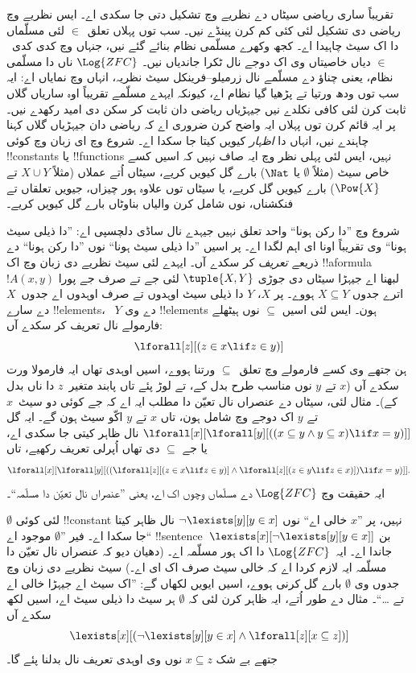 \documentclass[../../../include/open-logic-section]{subfiles}
\begin{document}


تقریباً ساری ریاضی سیٹاں دے نظریے وچ تشکیل دتی جا سکدی اے۔
ایس نظریے وچ ریاضی دی تشکیل لئی کئی کم کرن پینڈے نیں۔ سب توں
پہلاں تعلق~$\in$ لئی مسلّماں دا اک سیٹ چاہیدا اے۔ کجھ وکھرے
مسلّمی نظام بنائے گئے نیں، جنہاں وچ کدی کدی~$\in$ دیاں
خاصیتاں وی اک دوجے نال ٹکرا جاندیاں نیں۔ $\Log{ZFC}$ ناں دا
مسلّمی نظام، یعنی چناؤ دے مسلّمے نال زرمیلو--فرینکل سیٹ نظریہ،
انہاں وچ نمایاں اے: ایہ سب توں ودھ ورتیا تے پڑھیا گیا نظام اے،
کیونکہ ایہدے مسلّمے تقریباً اوہ ساریاں گلاں ثابت کرن لئی کافی
نکلدے نیں جیہڑیاں ریاضی دان ثابت کر سکن دی امید رکھدے نیں۔
پر ایہ قائم کرن توں پہلاں ایہ واضح کرن ضروری اے کہ ریاضی دان
جیہڑیاں گلاں کہنا چاہندے نیں، انہاں دا \emph{اظہار} کیویں
کیتا جا سکدا اے۔ شروع وچ ای زبان وچ کوئی !!{constant}s یا
!!{function}s نہیں، ایس لئی پہلی نظر وچ ایہ صاف نہیں کہ اسیں
کسے خاص سیٹ (مثلاً $\emptyset$ یا $\Nat$) بارے گل کیویں کریے،
سیٹاں اُتے عملاں (مثلاً $X \cup Y$ تے $\Pow{X}$) بارے کیویں
گل کریے، یا سیٹاں توں علاوہ ہور چیزاں، جیویں تعلقاں تے
فنکشناں، نوں شامل کرن والیاں بناوٹاں بارے گل کیویں کریے۔

شروع وچ ”دا رکن ہونا“ واحد تعلق نہیں جیہدے نال ساڈی دلچسپی اے:
”دا ذیلی سیٹ ہونا“ وی تقریباً اونا ای اہم لگدا اے۔ پر اسیں
”دا ذیلی سیٹ ہونا“ نوں ”دا رکن ہونا“ دے ذریعے \emph{تعریف}
کر سکدے آں۔ ایہدے لئی سیٹ نظریے دی زبان وچ اک
!!a{formula}~$!A(x, y)$ لبھنا اے جیہڑا سیٹاں دی جوڑی
$\tuple{X, Y}$ لئی جے تے صرف جے پورا اترے جدوں
$X \subseteq Y$ ہووے۔ پر $X$، $Y$ دا ذیلی سیٹ اوہدوں تے
صرف اوہدوں اے جدوں~$X$ دے سارے !!{element}s،
~$Y$ دے وی !!{element}s ہون۔ ایس لئی اسیں
$\subseteq$ نوں ہیٹھلے فارمولے نال تعریف کر سکدے آں:
\[
\lforall[z][(z \in x \lif z \in y)]
\]
ہن جتھے وی کسے فارمولے وچ تعلق~$\subseteq$ ورتنا ہووے،
اسیں اوہدی تھاں ایہ فارمولا ورت سکدے آں ($x$ تے $y$ نوں
مناسب طرح بدل کے، تے لوڑ پئے تاں پابند متغیر~$z$ دا ناں
بدل کے)۔ مثال لئی، سیٹاں دے عنصراں نال تعیّن دا مطلب ایہ
اے کہ جے کوئی دو سیٹ~$x$ تے $y$ اک دوجے وچ شامل ہون،
تاں $x$ تے $y$ اکّو سیٹ ہون گے۔ ایہ گل
$\lforall[x][\lforall[y][((x \subseteq y \land y
    \subseteq x) \lif x = y)]]$ نال ظاہر کیتی جا سکدی اے،
یا جے $\subseteq$ دی تھاں اُپرلی تعریف رکھیے، تاں
\[
\lforall[x][\lforall[y][((\lforall[z][(z \in x \lif z \in y)] \land
    \lforall[z][(z \in y \lif z \in x)]) \lif x = y)]].
\]
ایہ حقیقت وچ $\Log{ZFC}$ دے مسلّماں وچوں اک اے، یعنی
”عنصراں نال تعیّن دا مسلّمہ“۔

$\emptyset$ لئی کوئی !!{constant} نہیں، پر ”$x$ خالی اے“
نوں $\lnot \lexists[y][y \in x]$ نال ظاہر کیتا جا سکدا اے۔
فیر ”$\emptyset$ موجود اے“ !!{sentence}~$\lexists[x][\lnot \lexists[y][y \in
    x]]$ بن جاندا اے۔ ایہ~$\Log{ZFC}$ دا اک ہور مسلّمہ اے۔
(دھیان دیو کہ عنصراں نال تعیّن دا مسلّمہ ایہ لازم کردا اے
کہ خالی سیٹ صرف اک ای اے۔) سیٹ نظریے دی زبان وچ جدوں وی
$\emptyset$ بارے گل کرنی ہووے، اسیں ایویں لکھاں گے:
”اک سیٹ اے جیہڑا خالی اے تے \dots“۔ مثال دے طور اُتے،
ایہ ظاہر کرن لئی کہ $\emptyset$ ہر سیٹ دا ذیلی سیٹ اے،
اسیں لکھ سکدے آں
\[
\lexists[x][(\lnot\lexists[y][y \in x] \land \lforall[z][x \subseteq
    z])]
\]
جتھے بے شک $x \subseteq z$ نوں وی اوہدی تعریف نال
بدلنا پئے گا۔
\end{document}
